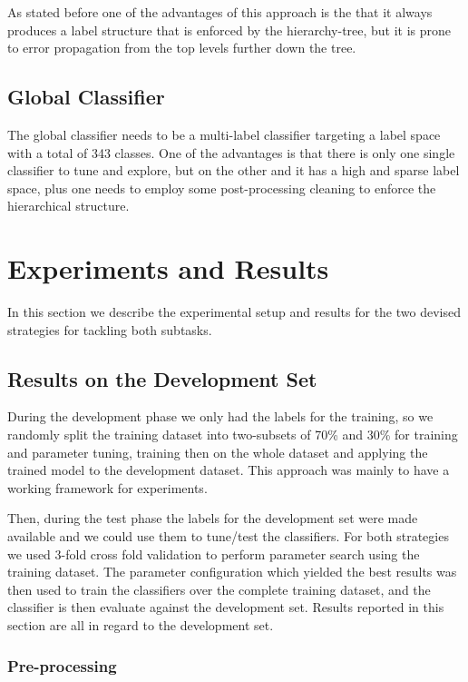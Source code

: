 \documentclass[11pt,a4paper]{article}
\begin{document}
As stated before one of the advantages of this approach is the that it always
produces a label structure that is enforced by the hierarchy-tree, but it is
prone to error propagation from the top levels further down the tree.


\subsection{Global Classifier}

The global classifier needs to be a multi-label classifier targeting a label
space with a total of 343 classes. One of the advantages is that there is only
one single classifier to tune and explore, but on the other and it has a high
and sparse label space, plus one needs to employ some post-processing cleaning
to enforce the hierarchical structure.

\section{Experiments and Results}\label{experiments}

In this section we describe the experimental setup and results for the two
devised strategies for tackling both subtasks.

\subsection{Results on the Development Set}

During the development phase we only had the labels for the training, so we
randomly split the training dataset into two-subsets of 70\% and 30\% for
training and parameter tuning, training then on the whole dataset and applying
the trained model to the development dataset. This approach was mainly to have
a working framework for experiments.

Then, during the test phase the labels for the development set were made available
and we could use them to tune/test the classifiers. For both strategies we used
3-fold cross fold validation to perform parameter search using the training dataset.
The parameter configuration which yielded the best results was then used to train
the classifiers over the complete training dataset, and the classifier is then
evaluate against the development set. Results reported in this section are all
in regard to the development set.

\subsubsection{Pre-processing}
\end{document}
